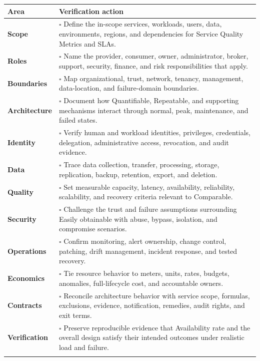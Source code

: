 \documentclass[11pt]{article}
\begin{document}
\begin{longtable}{@{}>{\bfseries\color{Teal}}p{}>{\RaggedRight\arraybackslash}p{}@{}}
\toprule\textbf{Area} & \textbf{Verification action}\\\midrule\endhead
Scope & $\square$ Define the in-scope services, workloads, users, data, environments, regions, and dependencies for Service Quality Metrics and SLAs. \\\addlinespace[2pt]
Roles & $\square$ Name the provider, consumer, owner, administrator, broker, support, security, finance, and risk responsibilities that apply. \\\addlinespace[2pt]
Boundaries & $\square$ Map organizational, trust, network, tenancy, management, data-location, and failure-domain boundaries. \\\addlinespace[2pt]
Architecture & $\square$ Document how Quantifiable, Repeatable, and supporting mechanisms interact through normal, peak, maintenance, and failed states. \\\addlinespace[2pt]
Identity & $\square$ Verify human and workload identities, privileges, credentials, delegation, administrative access, revocation, and audit evidence. \\\addlinespace[2pt]
Data & $\square$ Trace data collection, transfer, processing, storage, replication, backup, retention, export, and deletion. \\\addlinespace[2pt]
Quality & $\square$ Set measurable capacity, latency, availability, reliability, scalability, and recovery criteria relevant to Comparable. \\\addlinespace[2pt]
Security & $\square$ Challenge the trust and failure assumptions surrounding Easily obtainable with abuse, bypass, isolation, and compromise scenarios. \\\addlinespace[2pt]
Operations & $\square$ Confirm monitoring, alert ownership, change control, patching, drift management, incident response, and tested recovery. \\\addlinespace[2pt]
Economics & $\square$ Tie resource behavior to meters, units, rates, budgets, anomalies, full-lifecycle cost, and accountable owners. \\\addlinespace[2pt]
Contracts & $\square$ Reconcile architecture behavior with service scope, formulas, exclusions, evidence, notification, remedies, audit rights, and exit terms. \\\addlinespace[2pt]
Verification & $\square$ Preserve reproducible evidence that Availability rate and the overall design satisfy their intended outcomes under realistic load and failure. \\\addlinespace[2pt]
\bottomrule
\end{longtable}
\end{document}
